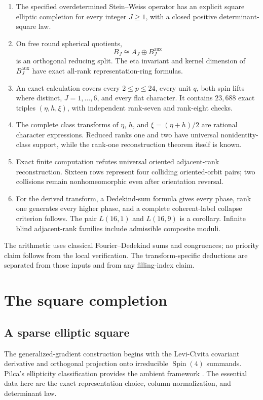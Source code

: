 \documentclass[11pt]{article}
\theoremstyle{definition}
\newcommand{\etaInv}{\eta}
\newcommand{\Spin}{\operatorname{Spin}}
\newcommand{\aux}{\mathrm{aux}}
\begin{document}
\begin{enumerate}[label=(\roman*)]
\item The specified overdetermined Stein--Weiss operator has an explicit
square elliptic completion for every integer $J\geq1$, with a closed positive
determinant-square law.
\item On free round spherical quotients,
\[
 B_J\cong A_J\oplus B_J^{\aux}
\]
is an orthogonal reducing split.  The eta invariant and kernel dimension of
$B_J^{\aux}$ have exact all-rank representation-ring formulas.
\item An exact calculation covers every $2\leq p\leq24$, every unit
$q$, both spin lifts where distinct, $J=1,\ldots,6$, and every flat character.
It contains $23{,}688$ exact triples $(\etaInv,h,\xi)$, with independent
rank-seven and rank-eight checks.
\item The complete class transforms of $\etaInv$, $h$, and
$\xi=(\etaInv+h)/2$ are rational character expressions.  Reduced ranks one
and two have universal nonidentity-class support, while the rank-one
reconstruction theorem itself is known.
\item Exact finite computation refutes universal oriented adjacent-rank
reconstruction.  Sixteen rows represent four colliding oriented-orbit
pairs; two collisions remain nonhomeomorphic even after orientation reversal.
\item For the derived transform, a Dedekind-sum formula gives every
phase, rank one generates every higher phase, and a complete coherent-label
collapse criterion follows. The pair $L(16,1)$ and $L(16,9)$ is a corollary.
Infinite blind adjacent-rank families include admissible composite moduli.
\end{enumerate}

The arithmetic uses classical Fourier--Dedekind sums and congruences; no
priority claim follows from the local verification. The transform-specific
deductions are separated from those inputs and from any filling-index claim.

\section{The square completion}

\subsection{A sparse elliptic square}

The generalized-gradient construction begins with the Levi-Civita covariant
derivative and orthogonal projection onto irreducible $\Spin(4)$ summands.
Pilca's ellipticity classification provides the ambient framework
\cite[arXiv v1, p.~9, Thms.~3.12--3.13]{Pilca2011}.  The essential data here are
the exact representation choice, column normalization, and determinant law.
\end{document}
